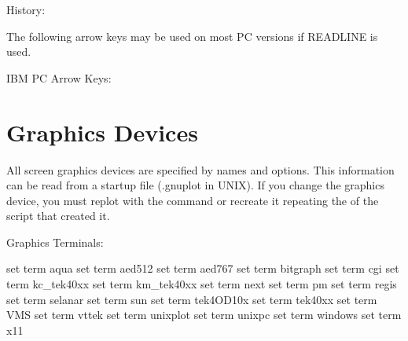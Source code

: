 History:

\endindentedkeys

The following arrow keys may be used on most PC versions if READLINE
is used.

\beginindentedkeys
IBM PC Arrow Keys:

\endindentedkeys



\section{Graphics Devices}

All screen graphics devices are specified by names and options.  This
information can be read from a startup file (.gnuplot in UNIX).  If
you change the graphics device, you must replot with the 
command or recreate it repeating the  of the script that
created it.


\beginindentedkeys

Graphics Terminals:

                                  {set term aqua}
                          {set term aed512}
                          {set term aed767}
                     {set term bitgraph}
                            {set term cgi}
        {set term kc_tek40xx}
         {set term km_tek40xx}
                    {set term next}
                 {set term pm}
                   {set term regis}
                      {set term selanar}
                     {set term sun}
       {set term tek4OD10x}
        {set term tek40xx}
                     {set term VMS}
         {set term vttek}
       {set term unixplot}
                  {set term unixpc}
                                {set term windows}
                      {set term x11}

